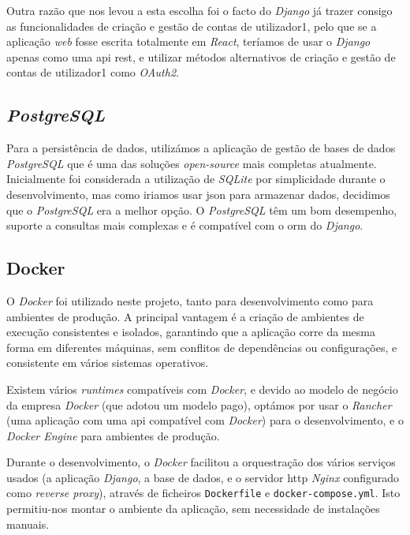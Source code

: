Outra razão que nos levou a esta escolha foi o facto do \textit{Django} já trazer consigo as funcionalidades de criação e gestão de contas de utilizador1, pelo que se a aplicação \textit{web} fosse escrita totalmente em \textit{React}, teríamos de usar o \textit{Django} apenas como uma \gls{api} \gls{rest}, e utilizar métodos alternativos de criação e gestão de contas de utilizador1 como \textit{OAuth2}.

\subsection{\textit{PostgreSQL}}

Para a persistência de dados, utilizámos a aplicação de gestão de bases de dados \textit{PostgreSQL} que é uma das soluções \textit{open-source} mais completas atualmente. Inicialmente foi considerada a utilização de \textit{SQLite} por simplicidade durante o desenvolvimento, mas como iriamos usar \gls{json} para armazenar dados,  decidimos que o \textit{PostgreSQL} era a melhor opção. O \textit{PostgreSQL} têm um bom desempenho, suporte a consultas mais complexas e é compatível com o \gls{orm} do \textit{Django}.

\subsection{Docker}

O \textit{Docker} foi utilizado neste projeto, tanto para desenvolvimento como para ambientes de produção. A principal vantagem é a criação de ambientes de execução consistentes e isolados, garantindo que a aplicação corre da mesma forma em diferentes máquinas, sem conflitos de dependências ou configurações, e consistente em vários sistemas operativos. 

Existem vários \textit{runtimes} compatíveis com \textit{Docker}, e devido ao modelo de negócio da empresa \textit{Docker} (que adotou um modelo pago), optámos por usar o \textit{Rancher} (uma aplicação com uma \gls{api} compatível com \textit{Docker}) para o desenvolvimento, e o \textit{Docker Engine} para ambientes de produção.

Durante o desenvolvimento, o \textit{Docker} facilitou a orquestração dos vários serviços usados (a aplicação \textit{Django}, a base de dados, e o servidor \gls{http} \textit{Nginx} configurado como \textit{reverse proxy}), através de ficheiros \texttt{Dockerfile} e \texttt{docker-compose.yml}. Isto permitiu-nos montar o ambiente da aplicação, sem necessidade de instalações manuais.

